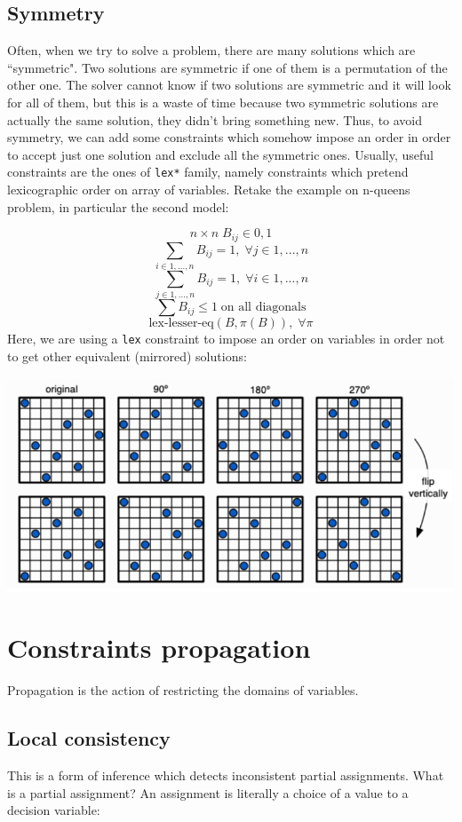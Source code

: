 \documentclass[10pt,a4paper]{article}
\begin{document}
\subsection{Symmetry}
Often, when we try to solve a problem, there are many solutions which are
``symmetric". Two solutions are symmetric if one of them is a permutation of the
other one. The solver cannot know if two solutions are symmetric and it will
look for all of them, but this is a waste of time because two symmetric
solutions are actually the same solution, they didn't bring something new. Thus,
to avoid symmetry, we can add some constraints which somehow impose an order in
order to accept just one solution and exclude all the symmetric ones. Usually,
useful constraints are the ones of \texttt{lex*} family, namely constraints
which pretend lexicographic order on array of variables. Retake the example on
n-queens problem, in particular the second model:

\[ n \times n \; B_{ij} \in {0, 1} \]
\[ \sum_{i \in {1, ..., n}} B_{ij} = 1, \; \forall j \in {1, ..., n} \]
\[ \sum_{j \in {1, ..., n}} B_{ij} = 1, \; \forall i \in {1, ..., n} \]
\[ \sum B_{ij} \leq 1 \; \textrm{on all diagonals} \]
\[ \textrm{lex-lesser-eq}(B, \pi(B)), \; \forall \pi \]
Here, we are using a \texttt{lex} constraint to impose an order on variables in
order not to get other equivalent (mirrored) solutions:

\includegraphics[scale=0.2]{nqueens-perm.png}

\section{Constraints propagation}
Propagation is the action of restricting the domains of variables.

\subsection{Local consistency}
This is a form of inference which detects inconsistent partial assignments. What
is a partial assignment? An assignment is literally a choice of a value to a
decision variable:
\end{document}
